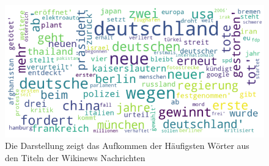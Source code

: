 \begin{figure}[H]
    \centering
    \includegraphics[width=13cm]{kapitel5/news.png}
    \caption[Word Cloud Analyse für die Wikinews Schlagzeilen]{Die Darstellung zeigt das Aufkommen der Häufigsten Wörter aus den Titeln der Wikinews Nachrichten}
    \label{Kap5:clwc}
\end{figure}
